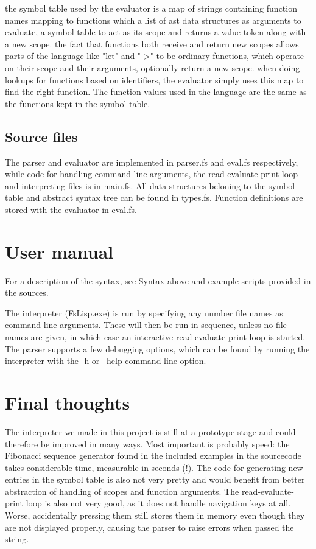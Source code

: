 \documentclass[11pt]{article}
\begin{document}
    the symbol table used by the evaluator is a map of strings containing function names mapping to functions which a list of ast data structures
    as arguments to evaluate, a symbol table to act as its scope and returns a value token along with a new scope. the fact that functions both
    receive and return new scopes allows parts of the language like "let" and "->" to be ordinary functions, which operate on their scope and 
    their arguments, optionally return a new scope.
    when doing lookups for functions based on identifiers, the evaluator simply uses this map to find the right function. The function values
    used in the language are the same as the functions kept in the symbol table.

\subsection{Source files}

    The parser and evaluator are implemented in parser.fs and eval.fs respectively, while code for handling command-line arguments, the read-evaluate-print
    loop and interpreting files is in main.fs. All data structures beloning to the symbol table and abstract syntax tree can be found in types.fs.
    Function definitions are stored with the evaluator in eval.fs.

\section{User manual}

    For a description of the syntax, see Syntax above and example scripts provided in the sources.

    The interpreter (FsLisp.exe) is run by specifying any number file names as command line arguments. These will then be run in sequence, unless
    no file names are given, in which case an interactive read-evaluate-print loop is started. The parser supports a few debugging options, which can
    be found by running the interpreter with the -h or --help command line option.

\section{Final thoughts}

    The interpreter we made in this project is still at a prototype stage and could therefore be improved in many ways. Most important is probably speed:
    the Fibonacci sequence generator found in the included examples in the sourcecode takes considerable time, measurable in seconds (!). The code for
    generating new entries in the symbol table is also not very pretty and would benefit from better abstraction of handling of scopes and function
    arguments. The read-evaluate-print loop is also not very good, as it does not handle navigation keys at all. Worse, accidentally pressing them
    still stores them in memory even though they are not displayed properly, causing the parser to raise errors when passed the string.
\end{document}
